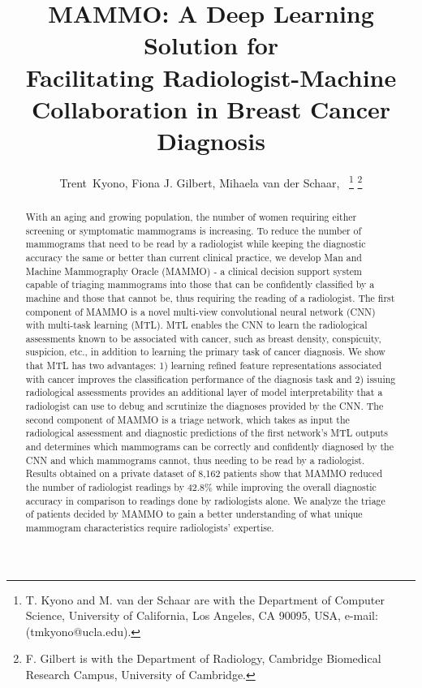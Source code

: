 \documentclass[journal]{IEEEtran}
\begin{document}
\title{MAMMO: A Deep Learning Solution for \\Facilitating Radiologist-Machine Collaboration in Breast Cancer Diagnosis}

\author{Trent~Kyono,
        Fiona J. Gilbert,
        Mihaela van der Schaar,~%
\thanks{T. Kyono and M. van der Schaar are with the Department
of Computer Science, University of California, Los Angeles, CA 90095, USA,
e-mail: (tmkyono@ucla.edu).}%
\thanks{F. Gilbert is with the Department of Radiology, Cambridge Biomedical Research Campus, University of Cambridge.}%
}%















\maketitle

\begin{abstract}

With an aging and growing population, the number of women requiring either screening or symptomatic mammograms is increasing. To reduce the number of mammograms that need to be read by a radiologist while keeping the diagnostic accuracy the same or better than current clinical practice, we develop Man and Machine Mammography Oracle (MAMMO) - a clinical decision support system capable of triaging mammograms into those that can be confidently classified by a machine and those that cannot be, thus requiring the reading of a radiologist.
The first component of MAMMO is a novel multi-view convolutional neural network (CNN) with multi-task learning (MTL). MTL enables the CNN to learn the radiological assessments known to be associated with cancer, such as breast density, conspicuity, suspicion, etc., in addition to learning the primary task of cancer diagnosis. We show that MTL has two advantages: 1) learning refined feature representations associated with cancer improves the classification performance of the diagnosis task and 2) issuing radiological assessments provides an additional layer of model interpretability that a radiologist can use to debug and scrutinize the diagnoses provided by the CNN. The second component of MAMMO is a triage network, which takes as input the radiological assessment and diagnostic predictions of the first network's MTL outputs and determines which mammograms can be correctly and confidently diagnosed by the CNN and which mammograms cannot, thus needing to be read by a radiologist. Results obtained on a private dataset of 8,162 patients show that MAMMO reduced the number of radiologist readings by 42.8\% while improving the overall diagnostic accuracy in comparison to readings done by radiologists alone. We analyze the triage of patients decided by MAMMO to gain a better understanding of what unique mammogram characteristics require radiologists' expertise.


\end{abstract}
\end{document}

